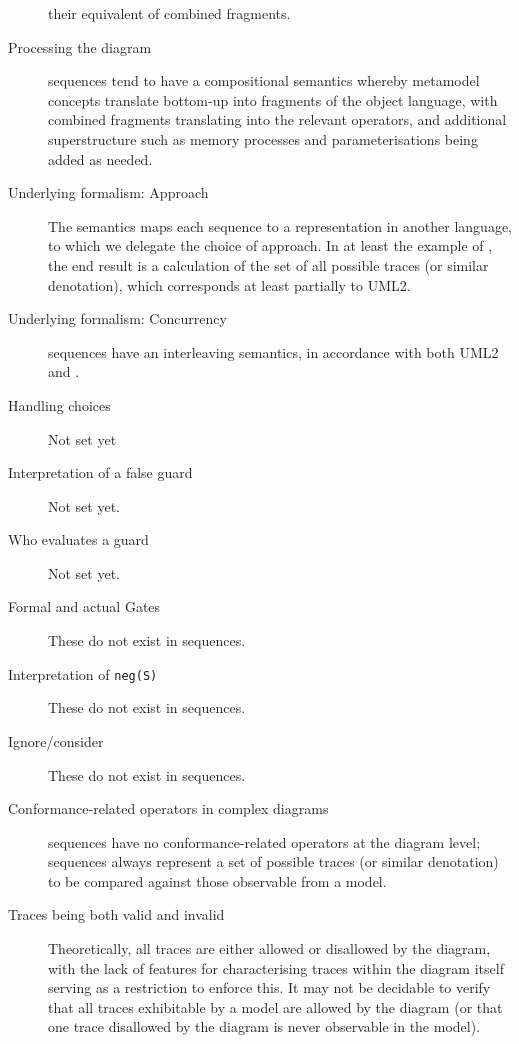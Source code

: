 \begin{description}
  their equivalent of combined fragments.  
\item[Processing the diagram]
  \langname{} sequences tend to have a compositional semantics whereby metamodel
  concepts translate bottom-up into fragments of
  the object language, with combined fragments translating into the relevant
  operators,
  and additional superstructure such as memory processes and parameterisations
  being added as needed.
\item[Underlying formalism: Approach]
  The \langname{} semantics maps each sequence to a representation in another
  language, to which we delegate the choice of approach.
  In at least the example of \tockcsp, the end result is a calculation of the
  set of all possible traces (or similar denotation), which corresponds at
  least partially to UML2.
\item[Underlying formalism: Concurrency]
  \langname{} sequences have an interleaving semantics, in accordance with
  both UML2 and \tockcsp.
\item[Handling choices]
  Not set yet
\item[Interpretation of a false guard]
  Not set yet.
\item[Who evaluates a guard]
  Not set yet.
\item[Formal and actual Gates]
  These do not exist in \langname{} sequences.
\item[Interpretation of \texttt{neg(S)}]
  These do not exist in \langname{} sequences.
\item[Ignore/consider]
  These do not exist in \langname{} sequences.
\item[Conformance-related operators in complex diagrams]
  \langname{} sequences have no conformance-related operators at the diagram
  level; sequences always represent a set of possible traces (or similar
  denotation) to be compared against those observable from a model.
\item[Traces being both valid and invalid]
  Theoretically, all traces are either allowed or disallowed by the diagram,
  with the lack of features for characterising traces within the diagram itself
  serving as a restriction to enforce this.  It may not
  be decidable to verify that all traces exhibitable by a model are allowed by
  the diagram (or that one trace disallowed by the diagram is never observable
  in the model).
\end{description}
